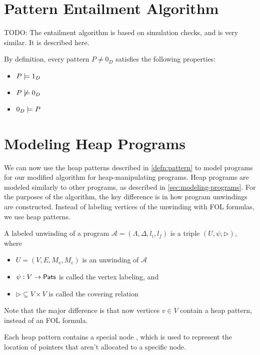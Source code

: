 \section{Pattern Entailment Algorithm}
\label{sec:entailment-algorithm}

TODO: The entailment algorithm is based on simulation checks, and is very similar. It is described here.

By definition, every pattern $P \neq 0_D$ satisfies the following properties:
\begin{itemize}
  \item $P \models 1_D$
  \item $P \not \models 0_D$
  \item $0_D \models P$
\end{itemize}

\section{Modeling Heap Programs}
\label{sec:modeling-heap-programs}

We can now use the heap patterns described in \autoref{defn:pattern} to model programs for our modified \impact algorithm for heap-manipulating programs. Heap programs are modeled similarly to other programs, as described in \autoref{sec:modeling-programs}. For the purposes of the \impact algorithm, the key difference is in how program unwindings are constructed. Instead of labeling vertices of the unwinding with FOL formulas, we use heap patterns.

\begin{defn}
  \label{defn:labeled-heap-prog-unwinding}
  A labeled unwinding of a program $\mathcal{A} = (\Lambda, \Delta, l_i, l_f)$ is a triple $(U, \psi, \rhd)$, where

  \begin{itemize}
    \item $U = (V, E, M_v, M_e)$ is an unwinding of $\mathcal{A}$
    \item $\psi : V \to \mathsf{Pats}$ is called the vertex labeling, and
    \item $\rhd \subseteq V \times V$ is called the covering relation
  \end{itemize}

  Note that the major difference is that now vertices $v \in V$ contain a heap pattern, instead of an FOL formula.
\end{defn}

Each heap pattern contains a special node \nilconst, which is used to represent the location of pointers that aren't allocated to a specific node.